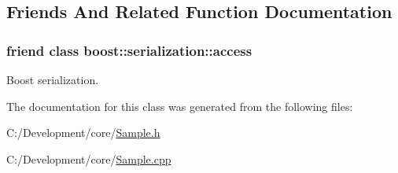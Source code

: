 \subsection{Friends And Related Function Documentation}
\hypertarget{class_c_discrete_sample_ac98d07dd8f7b70e16ccb9a01abf56b9c}{
\subsubsection[{boost\-::serialization\-::access}]{\setlength{\rightskip}{0pt plus 5cm}friend class boost\-::serialization\-::access\hspace{0.3cm}{\ttfamily [friend]}}}\label{class_c_discrete_sample_ac98d07dd8f7b70e16ccb9a01abf56b9c}


Boost serialization. 



The documentation for this class was generated from the following files\-:\begin{DoxyCompactItemize}
\item 
C\-:/\-Development/core/\hyperlink{_sample_8h}{Sample.\-h}\item 
C\-:/\-Development/core/\hyperlink{_sample_8cpp}{Sample.\-cpp}\end{DoxyCompactItemize}
